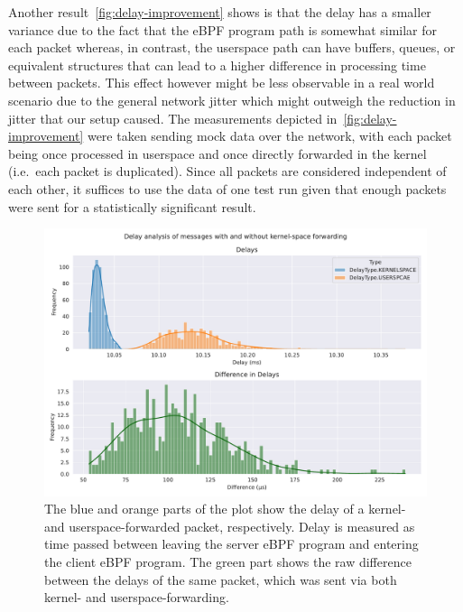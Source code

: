 Another result~\autoref{fig:delay-improvement} shows is that the delay has a smaller variance due to the fact 
that the eBPF program path is somewhat similar for each packet whereas, in contrast, the userspace path can have 
buffers, queues, or equivalent structures that can lead to a higher difference in processing time between packets. 
This effect however might be less observable in a real world scenario due to the general network jitter which 
might outweigh the reduction in jitter that our setup caused.
The measurements depicted in~\autoref{fig:delay-improvement} were taken sending mock data over 
the network, with each packet being once processed in userspace and once directly forwarded in the kernel
(i.e.~each packet is duplicated).
Since all packets are considered independent of each other, it suffices to use the data of one test run given 
that enough packets were sent for a statistically significant result.

\vspace{0.5cm}
\begin{figure}[H]
    \centering
    \includegraphics[width=\textwidth]{figures/04_testing_and_results/delays_small_packets_simple_userspace.pdf}
    \caption[Delay analysis of eBPF approach]{The blue and orange parts of the plot show the delay of a 
    kernel- and userspace-forwarded packet, respectively. Delay is measured as time passed between
    leaving the server eBPF program and entering the client eBPF program.
    The green part shows the raw difference between the delays of the same packet, which was sent via both 
    kernel- and userspace-forwarding.}\label{fig:delay-improvement}
\end{figure}
\vspace{0.5cm}

